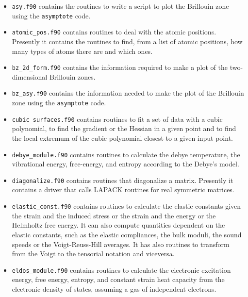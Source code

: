 \documentclass[12pt,a4paper]{article}
\begin{document}
\begin{itemize}

\item
\texttt{asy.f90} contains the routines to write a script to plot the
Brillouin zone using the \texttt{asymptote} code.

\item
\texttt{atomic\_pos.f90} contains routines to deal with the atomic positions.
Presently it contains the routines to find, from a list of atomic positions,
how many types of atoms there are and which ones.

\item
\texttt{bz\_2d\_form.f90} contains the information required to make a
plot of the two-dimensional Brillouin zones.

\item
\texttt{bz\_asy.f90} contains the information needed to make the plot       
of the Brillouin zone using the \texttt{asymptote} code.      

\item
\texttt{cubic\_surfaces.f90} contains routines to fit a set of data
with a cubic polynomial, to find the gradient or the Hessian in 
a given point and to find the local extremum of the cubic polynomial
closest to a given input point. 

\item
\texttt{debye\_module.f90} contains routines to calculate the debye 
temperature, the vibrational energy, free-energy, and entropy according
to the Debye's model.

\item
\texttt{diagonalize.f90} contains routines that diagonalize a matrix.
Presently it contains a driver that calls LAPACK routines
for real symmetric matrices.

\item
\texttt{elastic\_const.f90} contains routines to calculate the elastic
constants given the strain and the induced stress or the strain and
the energy or the Helmholtz free energy. It can also compute
quantities dependent on the elastic constants, such as the elastic 
compliances, the bulk moduli, the sound speeds or the Voigt-Reuss-Hill 
averages. It has also routines to transform from the Voigt to the 
tensorial notation and viceversa.

\item
\texttt{eldos\_module.f90} contains routines to calculate the electronic
excitation energy, free energy, entropy, and constant strain heat capacity
from the electronic density of states, assuming a gas of independent 
electrons.   


\end{itemize}
\end{document}
